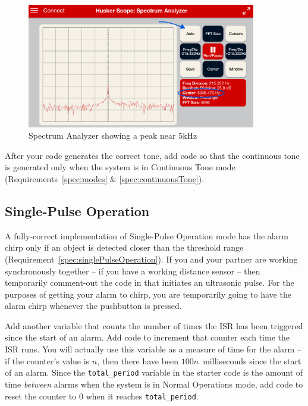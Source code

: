 \begin{figure}
    \centering
    \includegraphics[width=10cm]{SpectrumAnalyzer}
    \caption{Spectrum Analyzer showing a peak near 5kHz \label{fig:spectrumAnalyzer}}
\end{figure}

After your code generates the correct tone, add code so that the continuous tone is generated only when the system is in Continuous Tone mode (Requirements~\ref{spec:modes} \& \ref{spec:continuousTone}).


\subsection{Single-Pulse Operation} \label{subsec:soundSinglePulseOperation}

A fully-correct implementation of Single-Pulse Operation mode has the alarm chirp only if an object is detected closer than the threshold range (Requirement~\ref{spec:singlePulseOperation}).
If you and your partner are working synchronously together -- if you have a working distance sensor -- then temporarily comment-out the code in  that initiates an ultrasonic pulse.
For the purposes of getting your alarm to chirp, you are temporarily going to have the alarm chirp whenever the pushbutton is pressed.

\vspace{.5cm}

Add another variable that counts the number of times the ISR has been triggered since the start of an alarm.
Add code to increment that counter each time the ISR runs.
You will actually use this variable as a measure of time for the alarm -- if the counter's value is $n$, then there have been $100n$~milliseconds since the start of an alarm.
Since the \lstinline{total_period} variable in the starter code is the amount of time \textit{between} alarms when the system is in Normal Operations mode, add code to reset the counter to 0 when it reaches \lstinline{total_period}. %

